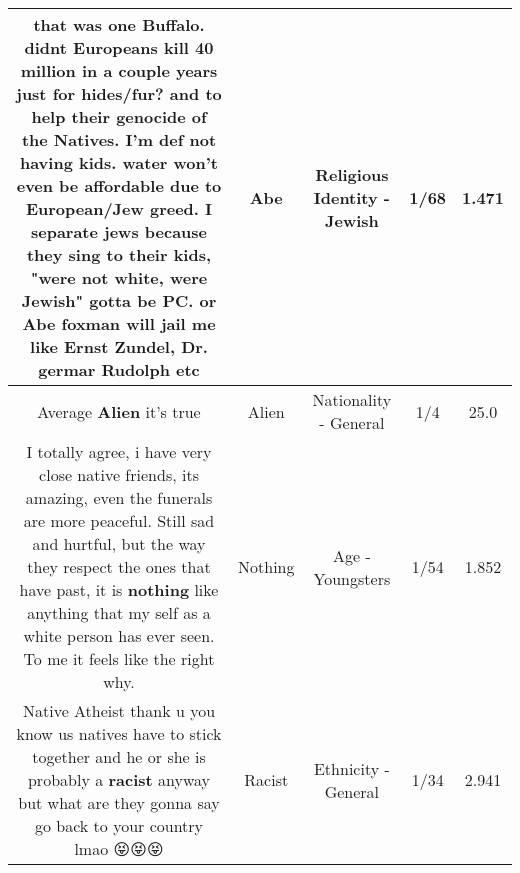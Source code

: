 \documentclass[11pt]{article}
\newlength\mylength
\begin{document}
\begin{center}
\begin{longtable}{|C{.65\mylength}|C{.30\mylength}|C{.12\mylength}|C{.12\mylength}|C{.12\mylength}|}
  \small that was one Buffalo. didnt Europeans kill 40 million in a couple years just for hides/fur? and to help their genocide of the Natives. I'm def not having kids. water won't even be affordable due to European/Jew greed. I separate jews because they sing to their kids, "were not white, were Jewish" gotta be PC. or \textbf{Abe} foxman will jail me like Ernst Zundel, Dr. germar Rudolph etc\normalsize   & Abe & Religious Identity - Jewish & 1/68 & 1.471 \\  \hline
  \small Average \textbf{Alien} it's true\normalsize   & Alien & Nationality - General & 1/4 & 25.0 \\  \hline
  \small I totally agree, i have very close native friends, its amazing, even the funerals are more peaceful. Still sad and hurtful, but the way they respect the ones that have past, it is \textbf{nothing} like anything that my self as a white person has ever seen. To me it feels like the right why.\normalsize   & Nothing & Age - Youngsters & 1/54 & 1.852 \\  \hline
  \small Native Atheist thank u you know us natives have to stick together and he or she is probably a \textbf{racist} anyway but what are they gonna say go back to your country lmao 😝😝😝\normalsize   & Racist & Ethnicity - General & 1/34 & 2.941 \\  \hline

\end{longtable}
\end{center}
\end{document}
